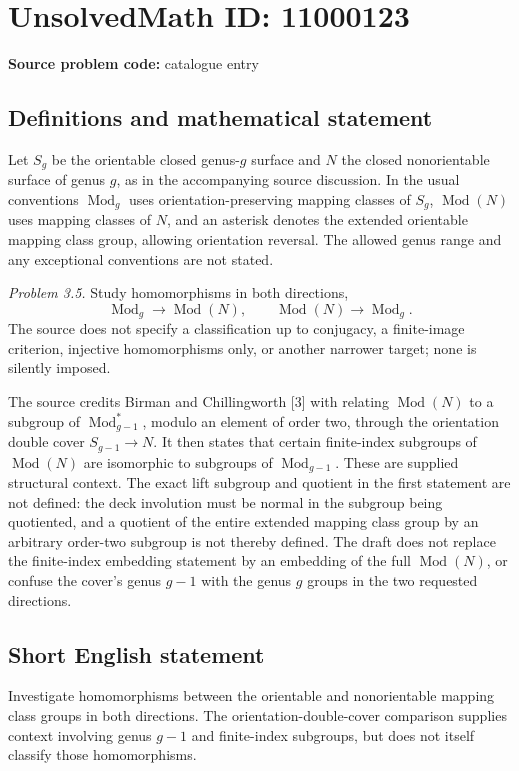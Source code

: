 \documentclass[11pt]{article}
\begin{document}
\section*{UnsolvedMath ID: 11000123}
\textbf{Source problem code:} catalogue entry
\subsection{Definitions and mathematical statement}
Let \(S_g\) be the orientable closed genus-\(g\) surface and \(N\) the closed nonorientable surface of genus \(g\), as in the accompanying source discussion. In the usual conventions \(\operatorname{Mod}_g\) uses orientation-preserving mapping classes of \(S_g\), \(\operatorname{Mod}(N)\) uses mapping classes of \(N\), and an asterisk denotes the extended orientable mapping class group, allowing orientation reversal. The allowed genus range and any exceptional conventions are not stated.

\emph{Problem 3.5.} Study homomorphisms in both directions,
\[
 \operatorname{Mod}_g\longrightarrow\operatorname{Mod}(N),
 \qquad\operatorname{Mod}(N)\longrightarrow\operatorname{Mod}_g.
\]
The source does not specify a classification up to conjugacy, a finite-image criterion, injective homomorphisms only, or another narrower target; none is silently imposed.

The source credits Birman and Chillingworth [3] with relating \(\operatorname{Mod}(N)\) to a subgroup of \(\operatorname{Mod}_{g-1}^*\), modulo an element of order two, through the orientation double cover \(S_{g-1}\to N\). It then states that certain finite-index subgroups of \(\operatorname{Mod}(N)\) are isomorphic to subgroups of \(\operatorname{Mod}_{g-1}\). These are supplied structural context. The exact lift subgroup and quotient in the first statement are not defined: the deck involution must be normal in the subgroup being quotiented, and a quotient of the entire extended mapping class group by an arbitrary order-two subgroup is not thereby defined. The draft does not replace the finite-index embedding statement by an embedding of the full \(\operatorname{Mod}(N)\), or confuse the cover's genus \(g-1\) with the genus \(g\) groups in the two requested directions.
\subsection{Short English statement}
Investigate homomorphisms between the orientable and nonorientable mapping class groups in both directions. The orientation-double-cover comparison supplies context involving genus \(g-1\) and finite-index subgroups, but does not itself classify those homomorphisms.
\end{document}
